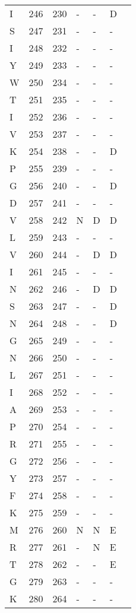 \documentclass[10pt]{article}
\begin{document}
\begin{longtable}{lllllll}
  I & 246 & 230 & - & - & D &  \\ 
  S & 247 & 231 & - & - & - &  \\ 
  I & 248 & 232 & - & - & - &  \\ 
  Y & 249 & 233 & - & - & - &  \\ 
  W & 250 & 234 & - & - & - &  \\ 
  T & 251 & 235 & - & - & - &  \\ 
  I & 252 & 236 & - & - & - &  \\ 
  V & 253 & 237 & - & - & - &  \\ 
  K & 254 & 238 & - & - & D &  \\ 
  P & 255 & 239 & - & - & - &  \\ 
  G & 256 & 240 & - & - & D &  \\ 
  D & 257 & 241 & - & - & - &  \\ 
  V & 258 & 242 & N & D & D &  \\ 
  L & 259 & 243 & - & - & - &  \\ 
  V & 260 & 244 & - & D & D &  \\ 
  I & 261 & 245 & - & - & - &  \\ 
  N & 262 & 246 & - & D & D &  \\ 
  S & 263 & 247 & - & - & D &  \\ 
  N & 264 & 248 & - & - & D &  \\ 
  G & 265 & 249 & - & - & - &  \\ 
  N & 266 & 250 & - & - & - &  \\ 
  L & 267 & 251 & - & - & - &  \\ 
  I & 268 & 252 & - & - & - &  \\ 
  A & 269 & 253 & - & - & - &  \\ 
  P & 270 & 254 & - & - & - &  \\ 
  R & 271 & 255 & - & - & - &  \\ 
  G & 272 & 256 & - & - & - &  \\ 
  Y & 273 & 257 & - & - & - &  \\ 
  F & 274 & 258 & - & - & - &  \\ 
  K & 275 & 259 & - & - & - &  \\ 
  M & 276 & 260 & N & N & E &  \\ 
  R & 277 & 261 & - & N & E &  \\ 
  T & 278 & 262 & - & - & E &  \\ 
  G & 279 & 263 & - & - & - &  \\ 
  K & 280 & 264 & - & - & - &  \\ 

\end{longtable}
\end{document}
